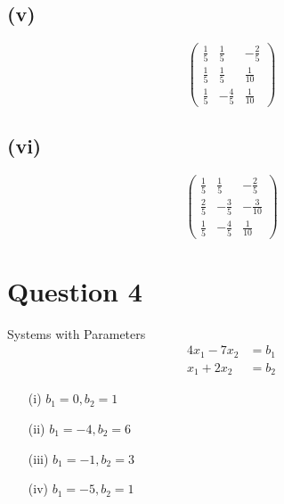 \documentclass[12pt]{article}
\begin{document}
\subsection*{(v)}
\[
\begin{pmatrix}
\frac{1}{5} & \frac{1}{5} & -\frac{2}{5}\\
\frac{1}{5} & \frac{1}{5} & \frac{1}{10}\\
\frac{1}{5} & -\frac{4}{5} & \frac{1}{10}
\end{pmatrix}
\]

\subsection*{(vi)}
\[
\begin{pmatrix}
\frac{1}{5} & \frac{1}{5} & -\frac{2}{5}\\
\frac{2}{5} & -\frac{3}{5} & -\frac{3}{10}\\
\frac{1}{5} & -\frac{4}{5} & \frac{1}{10}
\end{pmatrix}
\]

\section*{Question 4}
Systems with Parameters
\[
\begin{aligned}
4x_1 - 7x_2 &= b_1\\
x_1 + 2x_2 &= b_2
\end{aligned}
\]

\begin{itemize}
\item[(i)] $b_1 = 0, b_2 = 1$
\item[(ii)] $b_1 = -4, b_2 = 6$
\item[(iii)] $b_1 = -1, b_2 = 3$
\item[(iv)] $b_1 = -5, b_2 = 1$
\end{itemize}
\end{document}
